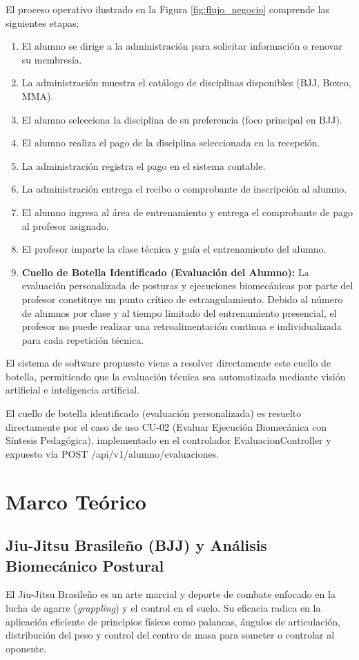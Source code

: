 El proceso operativo ilustrado en la Figura \ref{fig:flujo_negocio} comprende las siguientes etapas:
\begin{enumerate}
    \item El alumno se dirige a la administración para solicitar información o renovar su membresía.
    \item La administración muestra el catálogo de disciplinas disponibles (BJJ, Boxeo, MMA).
    \item El alumno selecciona la disciplina de su preferencia (foco principal en BJJ).
    \item El alumno realiza el pago de la disciplina seleccionada en la recepción.
    \item La administración registra el pago en el sistema contable.
    \item La administración entrega el recibo o comprobante de inscripción al alumno.
    \item El alumno ingresa al área de entrenamiento y entrega el comprobante de pago al profesor asignado.
    \item El profesor imparte la clase técnica y guía el entrenamiento del alumno.
    \item \textbf{Cuello de Botella Identificado (Evaluación del Alumno):} La evaluación personalizada de posturas y ejecuciones biomecánicas por parte del profesor constituye un punto crítico de estrangulamiento. Debido al número de alumnos por clase y al tiempo limitado del entrenamiento presencial, el profesor no puede realizar una retroalimentación continua e individualizada para cada repetición técnica.
\end{enumerate}

El sistema de software propuesto viene a resolver directamente este cuello de botella, permitiendo que la evaluación técnica sea automatizada mediante visión artificial e inteligencia artificial.

El cuello de botella identificado (evaluación personalizada) es resuelto directamente por el caso de uso CU-02 (Evaluar Ejecución Biomecánica con Síntesis Pedagógica), implementado en el controlador EvaluacionController y expuesto vía POST /api/v1/alumno/evaluaciones.

\newpage

\section{Marco Teórico}

\subsection{Jiu-Jitsu Brasileño (BJJ) y Análisis Biomecánico Postural}
El Jiu-Jitsu Brasileño es un arte marcial y deporte de combate enfocado en la lucha de agarre (\textit{grappling}) y el control en el suelo. Su eficacia radica en la aplicación eficiente de principios físicos como palancas, ángulos de articulación, distribución del peso y control del centro de masa para someter o controlar al oponente.

